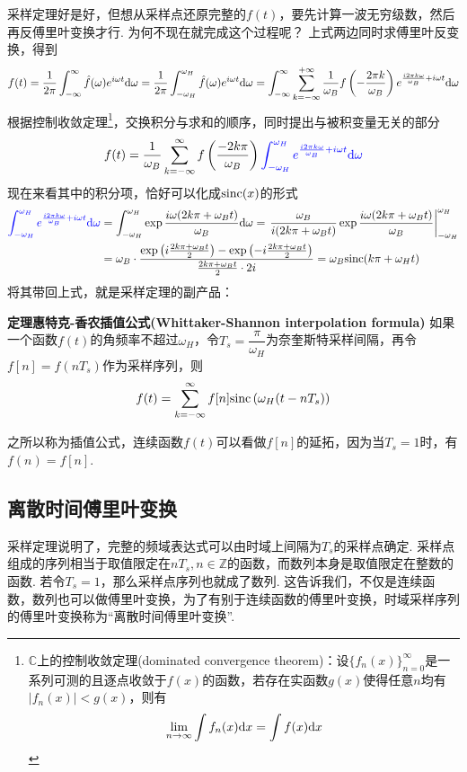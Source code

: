 \documentclass[UTF8]{ctexart}
\newcommand{\trm}[1]{{\rm #1}}
\newenvironment{theorem}[1]
    {\begin{tcolorbox}[enhanced, colback=LightYellow, breakable=true, frame hidden, borderline west={1.5mm}{-2mm}{DarkBlue}]
    {\bfseries {\color{DarkBlue} 定理}\quad #1} \newline}
    {\end{tcolorbox}}
\begin{document}
采样定理好是好，但想从采样点还原完整的\(f(t)\)，要先计算一波无穷级数，然后再反傅里叶变换才行. 为何不现在就完成这个过程呢？
上式两边同时求傅里叶反变换，得到
\[f(t) = \frac{1}{2\pi}\int_{-\infty}^{\infty}\hat{f}(\omega)e^{i\omega t}\trm{d}\omega 
= \frac{1}{2\pi}\int_{-\omega_H}^{\omega_H}\hat{f}(\omega)e^{i\omega t}\trm{d}\omega 
= \int_{-\infty}^{\infty}\sum_{k=-\infty}^{+\infty} \frac{1}{\omega_B}f\left(-\frac{2\pi k}{\omega_B}\right)e^{\frac{i2\pi k\omega}{\omega_B} + i\omega t}\trm{d}\omega\]
根据控制收敛定理\footnote{\(\mathbb{C}\)上的控制收敛定理(dominated convergence theorem)：设\(\{f_n(x)\}_{n=0}^{\infty}\)是一系列可测的且逐点收敛于\(f(x)\)的函数，若存在实函数\(g(x)\)使得任意\(n\)均有\(|f_n(x)|<g(x)\)，则有\[\lim_{n \to \infty}\int f_n(x)\trm{d}x = \int f(x)\trm{d}x\]}，交换积分与求和的顺序，同时提出与被积变量无关的部分
\[f(t) = \frac{1}{\omega_B}\sum_{k=-\infty}^{\infty}f\left(\frac{-2k\pi}{\omega_B}\right){\color{blue}\int_{-\omega_H}^{\omega_H}e^{\frac{i2\pi k\omega}{\omega_B} + i\omega t}\trm{d}\omega}\]
现在来看其中的积分项，恰好可以化成\(\trm{sinc}(x)\)的形式
\begin{align*}
    {\color{blue}\int_{-\omega_H}^{\omega_H}e^{\frac{i2\pi k\omega}{\omega_B} + i\omega t}\trm{d}\omega} 
    &= \int_{-\omega_H}^{\omega_H}\exp{\frac{i\omega(2k\pi+\omega_Bt)}{\omega_B}}\trm{d}\omega
    = \left.\frac{\omega_B}{i(2k\pi+\omega_Bt)}\exp{\frac{i\omega(2k\pi+\omega_Bt)}{\omega_B}}\right|_{-\omega_H}^{\omega_H} \\
    &= \omega_B\cdot\frac{\exp\left(i\frac{2k\pi+\omega_Bt}{2}\right) - \exp\left(-i\frac{2k\pi+\omega_Bt}{2}\right)}{\frac{2k\pi+\omega_Bt}{2}\cdot 2i} = \omega_B\trm{sinc}(k\pi+\omega_Ht)
\end{align*}
将其带回上式，就是采样定理的副产品：
\begin{theorem}{惠特克-香农插值公式(Whittaker-Shannon interpolation formula)}
    如果一个函数\(f(t)\)的角频率不超过\(\omega_H\)，令\(T_s=\dfrac{\pi}{\omega_H}\)为奈奎斯特采样间隔，再令\(f[n]=f(nT_s)\)作为采样序列，则
    \[f(t) = \sum_{k=-\infty}^{\infty}f[n]\trm{sinc}\left(\omega_H(t-nT_s)\right)\]
\end{theorem}
之所以称为插值公式，连续函数\(f(t)\)可以看做\(f[n]\)的延拓，因为当\(T_s=1\)时，有\(f(n)=f[n]\).

\subsection{离散时间傅里叶变换}

采样定理说明了，完整的频域表达式可以由时域上间隔为\(T_s\)的采样点确定. 采样点组成的序列相当于取值限定在\(nT_s, n\in \mathbb{Z}\)的函数，而数列本身是取值限定在整数的函数. 若令\(T_s=1\)，那么采样点序列也就成了数列. 这告诉我们，不仅是连续函数，数列也可以做傅里叶变换，为了有别于连续函数的傅里叶变换，时域采样序列的傅里叶变换称为“离散时间傅里叶变换”.
\end{document}
